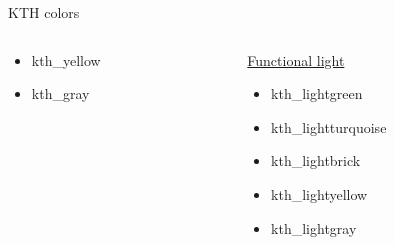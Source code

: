 \documentclass[aspectratio=169,11pt]{beamer}
\begin{document}
\begin{frame}{\insertsection}{KTH colors}
\begin{columns}[t]
\begin{column}{0.24\textwidth}
\begin{itemize}
                \item \textcolor{kth_yellow}{kth\_yellow}
                \item \textcolor{kth_gray}{kth\_gray}
            \end{itemize}
        \end{column}
        \begin{column}{0.3\textwidth}
            \underline{Functional light}
            \begin{itemize}
                \item \textcolor{kth_lightgreen}{kth\_lightgreen}
                \item \textcolor{kth_lightturquoise}{kth\_lightturquoise}
                \item \textcolor{kth_lightbrick}{kth\_lightbrick}
                \item \textcolor{kth_lightyellow}{kth\_lightyellow}
                \item \textcolor{kth_lightgray}{kth\_lightgray}
            \end{itemize}
        \end{column}
    \end{columns}
    
\end{frame}
\end{document}
